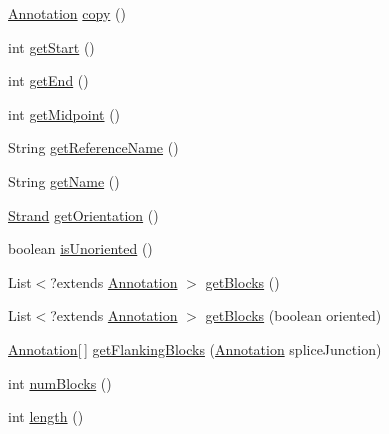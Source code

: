 \begin{DoxyCompactItemize}
\item 
\hyperlink{interfaceumms_1_1core_1_1annotation_1_1_annotation}{Annotation} \hyperlink{classumms_1_1core_1_1annotation_1_1_basic_annotation_aafaa36eb94c730a1325e356a519e8e09}{copy} ()
\item 
int \hyperlink{classumms_1_1core_1_1annotation_1_1_basic_annotation_a2f52387ec04cec413c4fea644ad6dd9f}{get\+Start} ()
\item 
int \hyperlink{classumms_1_1core_1_1annotation_1_1_basic_annotation_a3fe8028115f96664761b63a9d16926cf}{get\+End} ()
\item 
int \hyperlink{classumms_1_1core_1_1annotation_1_1_basic_annotation_acf96ec93c503abe161f40e346992fe68}{get\+Midpoint} ()
\item 
String \hyperlink{classumms_1_1core_1_1annotation_1_1_basic_annotation_aabdddcc39fc1c200ede2a7b72987127a}{get\+Reference\+Name} ()
\item 
String \hyperlink{classumms_1_1core_1_1annotation_1_1_basic_annotation_a75317ca06eb03c9e96cf18862e652c35}{get\+Name} ()
\item 
\hyperlink{enumumms_1_1core_1_1annotation_1_1_annotation_1_1_strand}{Strand} \hyperlink{classumms_1_1core_1_1annotation_1_1_basic_annotation_aa5ccd2fae3fd4bd937ba202512db8030}{get\+Orientation} ()
\item 
boolean \hyperlink{classumms_1_1core_1_1annotation_1_1_basic_annotation_a60bb0d08360fd4bce2974c8aeae80cab}{is\+Unoriented} ()
\item 
List$<$?extends \hyperlink{interfaceumms_1_1core_1_1annotation_1_1_annotation}{Annotation} $>$ \hyperlink{classumms_1_1core_1_1annotation_1_1_basic_annotation_a59ef0358ee04952f6ddd2c2bd4e448f7}{get\+Blocks} ()
\item 
List$<$?extends \hyperlink{interfaceumms_1_1core_1_1annotation_1_1_annotation}{Annotation} $>$ \hyperlink{classumms_1_1core_1_1annotation_1_1_basic_annotation_ab25d0e3c56d554e3426bf2d3ecf9d7c8}{get\+Blocks} (boolean oriented)
\item 
\hyperlink{interfaceumms_1_1core_1_1annotation_1_1_annotation}{Annotation}\mbox{[}$\,$\mbox{]} \hyperlink{classumms_1_1core_1_1annotation_1_1_basic_annotation_a3e559cf112dcf53643c073df5bf7c1aa}{get\+Flanking\+Blocks} (\hyperlink{interfaceumms_1_1core_1_1annotation_1_1_annotation}{Annotation} splice\+Junction)
\item 
int \hyperlink{classumms_1_1core_1_1annotation_1_1_basic_annotation_a369462b8ed7a0913747b21ca43e25366}{num\+Blocks} ()
\item 
int \hyperlink{classumms_1_1core_1_1annotation_1_1_basic_annotation_a7cdf318c0a172123e809e40248b03af4}{length} ()

\end{DoxyCompactItemize}
